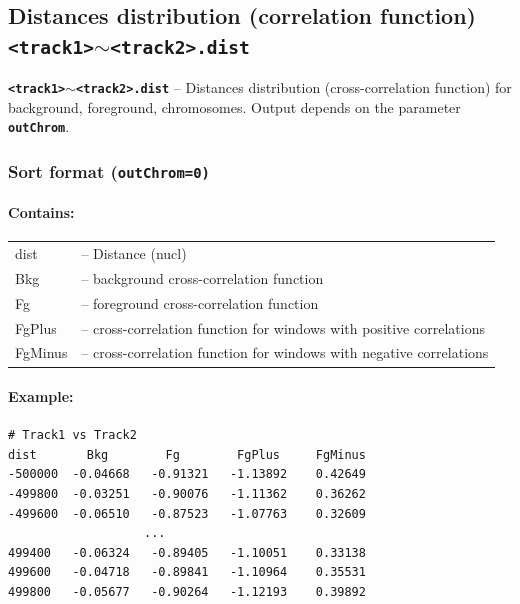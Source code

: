 \documentclass{article}
\newcommand{\tw}{\textwidth}
\newcommand{\prm}[1]{\texttt{\textbf{{#1}}}}
\begin{document}
\subsection{Distances distribution (correlation function) \prm{<track1>$\sim$<track2>.dist}}
\prm{<track1>$\sim$<track2>.dist} – Distances distribution (cross-correlation function) for background, foreground, chromosomes.
Output depends on the parameter \prm{outChrom}. 
\subsubsection{Sort format (\prm{outChrom=0)}}

\paragraph{Contains:}
\begin{tabular}{ll}
dist   & -- Distance (nucl)\\
Bkg    & -- background cross-correlation function\\
Fg     & -- foreground cross-correlation  function\\
FgPlus & -- cross-correlation  function for windows with positive correlations\\
FgMinus& -- cross-correlation  function for windows with negative correlations
\end{tabular}

\paragraph{Example:}\;\;
\begin{minipage}{0.6\tw}
\begin{shaded} 
\begin{verbatim}
# Track1 vs Track2
dist       Bkg        Fg        FgPlus     FgMinus
-500000  -0.04668   -0.91321   -1.13892    0.42649
-499800	 -0.03251   -0.90076   -1.11362    0.36262
-499600	 -0.06510   -0.87523   -1.07763    0.32609
                   ...  
499400   -0.06324   -0.89405   -1.10051    0.33138
499600   -0.04718   -0.89841   -1.10964	   0.35531
499800   -0.05677   -0.90264   -1.12193	   0.39892                            
\end{verbatim}
\end{shaded}
\end{minipage}
\end{document}
